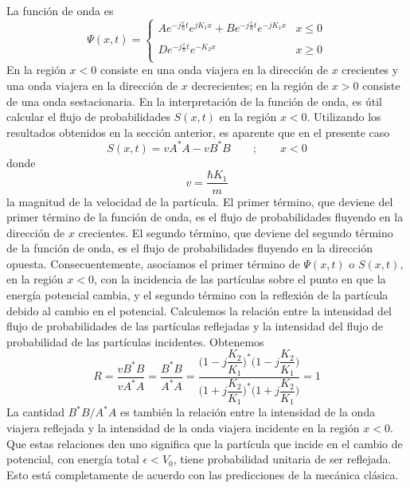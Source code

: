 \documentclass[12pt,a4paper]{article}
\def\e{{\epsilon}} %
\begin{document}
La función de onda es
\[
\Psi(x,t)=
\left\{
\begin{array}{ll}
Ae^{-j\frac{\e}{\hbar}t}e^{jK_{1}x}+Be^{-j\frac{\e}{\hbar}t}e^{-jK_{1}x} & x \leq 0 \\
 & \\
De^{-j\frac{\e}{\hbar}t}e^{-K_{2}x} & x \geq 0 \\
\end{array}
\right.
\]
En la región $x<0$ consiste en una onda viajera en la dirección de $x$ crecientes y una onda viajera en la dirección de $x$ decrecientes; en la región de $x>0$ consiste de una onda sestacionaria. En la interpretación de la función de onda, es útil calcular el flujo de probabilidades $S(x,t)$ en la región $x<0$. Utilizando los resultados obtenidos en la sección anterior, es aparente que en el presente caso
\[ S(x,t)=vA^{\ast}A-vB^{\ast}B \qquad ; \qquad x <0\]
donde
\[ v=\frac{\hbar K_{1}}{m} \]
la magnitud de la velocidad de la partícula. El primer término, que deviene del primer término de la función de onda, es el flujo de probabilidades fluyendo en la dirección de $x$ crecientes. El segundo término, que deviene del segundo término de la función de onda, es el flujo de probabilidades fluyendo en la dirección opuesta. Consecuentemente, asociamos el primer término de $\Psi(x,t)$ o $S(x,t)$, en la región $x<0$, con la incidencia de las partículas sobre el punto en que la energía potencial cambia, y el segundo término con la reflexión de la partícula debido al cambio en el potencial. Calculemos la relación entre la intensidad del flujo de probabilidades de las partículas reflejadas y la intensidad del flujo de probabilidad de las partículas incidentes. Obtenemos
\[ R=\frac{vB^{\ast}B}{vA^{\ast}A}=\frac{B^{\ast}B}{A^{\ast}A}=\frac{\bigg( 1-j\dfrac{K_{2}}{K_{1}} \bigg)^{\ast} \bigg( 1-j\dfrac{K_{2}}{K_{1}} \bigg)}{\bigg( 1 + j \dfrac{K_{2}}{K_{1}} \bigg)^{\ast} \bigg( 1+j\dfrac{K_{2}}{K_{1}} \bigg)}=1 \]
La cantidad $B^{\ast}B/A^{\ast}A$ es también la relación entre la intensidad de la onda viajera reflejada y la intensidad de la onda viajera incidente en la región $x<0$. Que estas relaciones den uno significa que la partícula que incide en el cambio de potencial, con energía total $\e < V_{0}$, tiene probabilidad unitaria de ser reflejada. Esto está completamente de acuerdo con las predicciones de la mecánica clásica.
\end{document}
